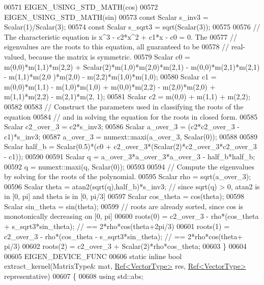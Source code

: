 \begin{DoxyCode}
00571     EIGEN\_USING\_STD\_MATH(cos)
00572     EIGEN\_USING\_STD\_MATH(sin)
00573     \textcolor{keyword}{const} Scalar s\_inv3 = Scalar(1)/Scalar(3);
00574     \textcolor{keyword}{const} Scalar s\_sqrt3 = sqrt(Scalar(3));
00575 
00576     \textcolor{comment}{// The characteristic equation is x^3 - c2*x^2 + c1*x - c0 = 0.  The}
00577     \textcolor{comment}{// eigenvalues are the roots to this equation, all guaranteed to be}
00578     \textcolor{comment}{// real-valued, because the matrix is symmetric.}
00579     Scalar c0 = m(0,0)*m(1,1)*m(2,2) + Scalar(2)*m(1,0)*m(2,0)*m(2,1) - m(0,0)*m(2,1)*m(2,1) - m(1,1)*m(2,0
      )*m(2,0) - m(2,2)*m(1,0)*m(1,0);
00580     Scalar c1 = m(0,0)*m(1,1) - m(1,0)*m(1,0) + m(0,0)*m(2,2) - m(2,0)*m(2,0) + m(1,1)*m(2,2) - m(2,1)*m(2,
      1);
00581     Scalar c2 = m(0,0) + m(1,1) + m(2,2);
00582 
00583     \textcolor{comment}{// Construct the parameters used in classifying the roots of the equation}
00584     \textcolor{comment}{// and in solving the equation for the roots in closed form.}
00585     Scalar c2\_over\_3 = c2*s\_inv3;
00586     Scalar a\_over\_3 = (c2*c2\_over\_3 - c1)*s\_inv3;
00587     a\_over\_3 = numext::maxi(a\_over\_3, Scalar(0));
00588 
00589     Scalar half\_b = Scalar(0.5)*(c0 + c2\_over\_3*(Scalar(2)*c2\_over\_3*c2\_over\_3 - c1));
00590 
00591     Scalar q = a\_over\_3*a\_over\_3*a\_over\_3 - half\_b*half\_b;
00592     q = numext::maxi(q, Scalar(0));
00593 
00594     \textcolor{comment}{// Compute the eigenvalues by solving for the roots of the polynomial.}
00595     Scalar rho = sqrt(a\_over\_3);
00596     Scalar theta = atan2(sqrt(q),half\_b)*s\_inv3;  \textcolor{comment}{// since sqrt(q) > 0, atan2 is in [0, pi] and theta is in
       [0, pi/3]}
00597     Scalar cos\_theta = cos(theta);
00598     Scalar sin\_theta = sin(theta);
00599     \textcolor{comment}{// roots are already sorted, since cos is monotonically decreasing on [0, pi]}
00600     roots(0) = c2\_over\_3 - rho*(cos\_theta + s\_sqrt3*sin\_theta); \textcolor{comment}{// == 2*rho*cos(theta+2pi/3)}
00601     roots(1) = c2\_over\_3 - rho*(cos\_theta - s\_sqrt3*sin\_theta); \textcolor{comment}{// == 2*rho*cos(theta+ pi/3)}
00602     roots(2) = c2\_over\_3 + Scalar(2)*rho*cos\_theta;
00603   \}
00604 
00605   EIGEN\_DEVICE\_FUNC
00606   \textcolor{keyword}{static} \textcolor{keyword}{inline} \textcolor{keywordtype}{bool} extract\_kernel(MatrixType& mat, \hyperlink{group___core___module_class_eigen_1_1_ref}{Ref<VectorType>} res, 
      \hyperlink{group___core___module_class_eigen_1_1_ref}{Ref<VectorType>} representative)
00607   \{
00608     \textcolor{keyword}{using} std::abs;

\end{DoxyCode}
